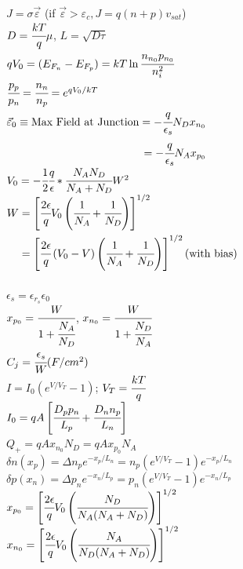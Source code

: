 \documentclass[12pt]{article}
\newcommand\tab[1][1cm]{\hspace*{#1}}
\begin{document}
\begin{small}
\begin{multicols*}{2}
			\noindent$J = \sigma \vec{\varepsilon}$ \tab[0.5cm] (if $\vec\varepsilon > \varepsilon_c, J = q(n+p)v_{sat}$)\\
			$D = \cfrac{kT}{q}\mu$, $L=\sqrt{D\tau}$\\
			$qV_0 = (E_{F_n}-E_{F_p})=kT\ln \cfrac{n_{n_0}p_{n_0}}{n_i^2}$\\
			$\cfrac{p_p}{p_n}=\cfrac{n_n}{n_p}=e^{qV_0/kT}$\\
			$\begin{aligned}
				\vec\varepsilon_0 \equiv \text{Max Field at Junction} = -\cfrac{q}{\epsilon_s}N_Dx_{n_0}\\
				 = -\cfrac{q}{\epsilon_s}N_Ax_{p_0}
			\end{aligned}$\\
			$V_0 = -\cfrac{1}{2}\cfrac{q}{\epsilon}*\cfrac{N_AN_D}{N_A+N_D} W^2$\\
			$\begin{aligned}
				W&=\left[ \cfrac{2\epsilon}{q} V_0 \left(\cfrac{1}{N_A}+\cfrac{1}{N_D}\right)\right]^{1/2}\\
				&=\left[ \cfrac{2\epsilon}{q} \left(V_0-V\right) \left(\cfrac{1}{N_A}+\cfrac{1}{N_D}\right)\right]^{1/2}\text{(with bias)}
			\end{aligned}$\\\\
			$\epsilon_s = \epsilon_{r_s}\epsilon_0$\\
			$x_{p_0} = \cfrac{W}{1+\cfrac{N_A}{N_D}}$, \tab[0.5cm] $x_{n_0} = \cfrac{W}{1+\cfrac{N_D}{N_A}}$\\
			$C_j = \cfrac{\epsilon_s}{W} (F/cm^2)$\\
			$I = I_0(e^{V/V_T}-1)$; $V_T=\cfrac{kT}{q}$\\
			$I_0=qA\left[\cfrac{D_pp_n}{L_p} + \cfrac{D_nn_p}{L_n}\right]$\\
			$Q_+ = qAx_{n_0}N_D=qAx_{p_0}N_A$\\
			$\delta n(x_p) = \Delta n_p e^{-x_p/L_n}=n_p(e^{V/V_T}-1)e^{-x_p/L_n}$\\
			$\delta p(x_n) = \Delta p_n e^{-x_n/L_p}=p_n(e^{V/V_T}-1)e^{-x_n/L_p}$\\
			$x_{p_0} = \left[ \cfrac{2\epsilon}{q}V_0\left(\cfrac{N_D}{N_A(N_A+N_D)}\right)\right]^{1/2}$\\
			$x_{n_0} = \left[ \cfrac{2\epsilon}{q}V_0\left(\cfrac{N_A}{N_D(N_A+N_D)}\right)\right]^{1/2}$\\
			

\end{multicols*}
\end{small}
\end{document}

